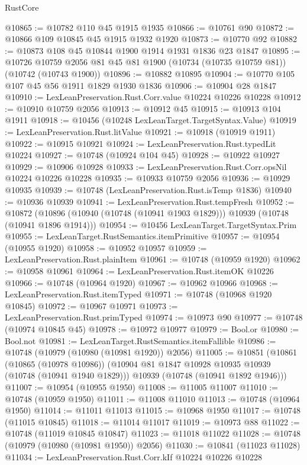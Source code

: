 \begin{lexlean}{RustCore}
\begin{coremodule}
@10865 := @10782 @110 @45 @1915 @1935
@10866 := @10761 @90
@10872 := @10866 @109 @10845 @45 @1915 @1932 @1920
@10873 := @10770 @92
@10882 := @10873 @108 @45 @10844 @1900 @1914 @1931 @1836 @23 @1847
@10895 := @10726 @10759 @2056 @81 @45 @81 @1900 (@10734 (@10735 @10759 @81)) (@10742 (@10743 @1900))
@10896 := @10882 @10895
@10904 := @10770 @105 @107 @45 @56 @1911 @1829 @1930 @1836
@10906 := @10904 @28 @1847
@10910 := LexLeanPreservation.Rust.Corr.value @10224 @10226 @10228
@10912 := @10910 @10759 @2056
@10913 := @10912 @45
@10915 := @10913 @104 @1911
@10918 := @10456 (@10248 LexLeanTarget.TargetSyntax.Value)
@10919 := LexLeanPreservation.Rust.litValue
@10921 := @10918 (@10919 @1911)
@10922 := @10915 @10921
@10924 := LexLeanPreservation.Rust.typedLit @10224
@10927 := @10748 (@10924 @104 @45)
@10928 := @10922 @10927
@10929 := @10906 @10928
@10933 := LexLeanPreservation.Rust.Corr.opsNil @10224 @10226 @10228
@10935 := @10933 @10759 @2056
@10936 := @10929 @10935
@10939 := @10748 (LexLeanPreservation.Rust.isTemp @1836)
@10940 := @10936 @10939
@10941 := LexLeanPreservation.Rust.tempFresh
@10952 := @10872
    (@10896 (@10940 (@10748 (@10941 @1903 @1829))) @10939 (@10748 (@10941 @1896 @1914)))
@10954 := @10456 LexLeanTarget.TargetSyntax.Prim
@10955 := LexLeanTarget.RustSemantics.itemPrimitive
@10957 := @10954 (@10955 @1920)
@10958 := @10952 @10957
@10959 := LexLeanPreservation.Rust.plainItem
@10961 := @10748 (@10959 @1920)
@10962 := @10958 @10961
@10964 := LexLeanPreservation.Rust.itemOK @10226
@10966 := @10748 (@10964 @1920)
@10967 := @10962 @10966
@10968 := LexLeanPreservation.Rust.itemTyped
@10971 := @10748 (@10968 @1920 @10845)
@10972 := @10967 @10971
@10973 := LexLeanPreservation.Rust.primTyped
@10974 := @10973 @90
@10977 := @10748 (@10974 @10845 @45)
@10978 := @10972 @10977
@10979 := Bool.or
@10980 := Bool.not
@10981 := LexLeanTarget.RustSemantics.itemFallible
@10986 := @10748 (@10979 (@10980 (@10981 @1920)) @2056)
@11005 := @10851
    (@10861
      (@10865 (@10978 @10986))
      (@10904 @81 @1847 @10928 @10935 @10939 (@10748 (@10941 @1940 @1829)))
      @10939
      (@10748 (@10941 @1892 @1946)))
@11007 := @10954 (@10955 @1950)
@11008 := @11005 @11007
@11010 := @10748 (@10959 @1950)
@11011 := @11008 @11010
@11013 := @10748 (@10964 @1950)
@11014 := @11011 @11013
@11015 := @10968 @1950
@11017 := @10748 (@11015 @10845)
@11018 := @11014 @11017
@11019 := @10973 @88
@11022 := @10748 (@11019 @10845 @10847)
@11023 := @11018 @11022
@11028 := @10748 (@10979 (@10980 (@10981 @1950)) @2056)
@11030 := @10841 (@11023 @11028)
@11034 := LexLeanPreservation.Rust.Corr.kIf @10224 @10226 @10228

\end{coremodule}
\end{lexlean}
